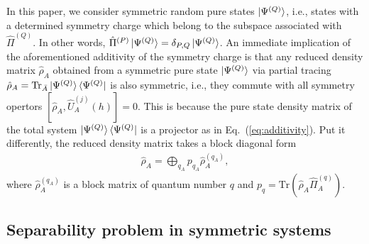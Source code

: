 \documentclass[aps,pra,reprint,superscriptaddress,twocolumn,notitlepage]{revtex4-1}
\newcommand{\Tr}{\text{Tr}}
\numberwithin{equation}{section}
\begin{document}
In this paper, we consider symmetric random pure states $\ket{\Psi^{(Q)}}$, i.e., states with a determined symmetry charge which belong to the subspace associated with $\hat \Pi^{(Q)}$. In other words, $\hat \Pi^{(P)}\ket{\Psi^{(Q)}}= \delta_{P,Q} \ket{\Psi^{(Q)}}$.
An immediate implication of the aforementioned additivity of the symmetry charge is that any reduced density matrix $\hat\rho_A$ obtained from a symmetric pure state $\ket{\Psi^{(Q)}}$ via partial tracing $\hat\rho_A = \Tr_{\bar A} \ket{\Psi^{(Q)}}\bra{\Psi^{(Q)}}$ is also symmetric,
i.e., they commute with all symmetry opertors
$[\hat\rho_{A}, \hat U^{(j)}_A(h) ]=0$. This is because the pure state density matrix of the total system $\ket{\Psi^{(Q)}}\bra{\Psi^{(Q)}}$ is a projector as in Eq.~(\ref{eq:additivity}).
Put it differently, the reduced density matrix takes a  block diagonal form
\begin{align}
\label{eq:rho-block}
\hat \rho_{A}= \bigoplus_{q_A} p_{q_A} \hat  \rho_A^{(q_A)},
\end{align}
where $\hat  \rho_A^{(q_A)}$ is a block matrix of quantum number $q$ and $p_q = \Tr (\hat \rho_A \hat \Pi_A^{(q)})$.


\subsection{Separability problem in symmetric systems}
\end{document}
